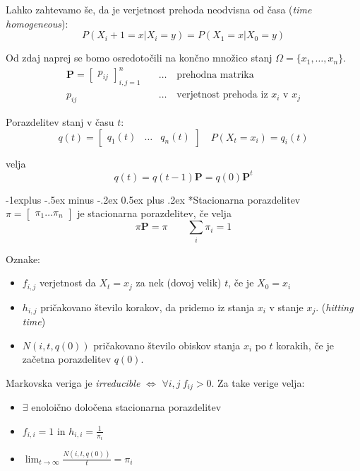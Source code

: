\documentclass[a3paper,8pt]{extarticle}
\makeatletter
\renewcommand{\subsection}{\@startsection{subsection}{2}{0mm}%
                                {-1explus -.5ex minus -.2ex}%
                                {0.5ex plus .2ex}%
                                {\normalfont\normalsize\bfseries}}
\makeatother
\begin{document}
\begin{multicols}{4}
Lahko zahtevamo še, da je verjetnost prehoda neodvisna od časa (\textit{time homogeneous}):
\[ P(X_i+1 = x | X_i = y) = P(X_1 = x | X_0 = y)\]

Od zdaj naprej se bomo osredotočili na končno množico stanj $\Omega = \{x_1, \dots, x_n\}$. 
\begin{align*}
    \mathbf{P} = \begin{bmatrix}
        p_{ij}
    \end{bmatrix}_{i,j = 1}^n\quad &\dots \quad \text{prehodna matrika} \\
    p_{ij} \quad &\dots \quad \text{verjetnost prehoda iz $x_i$ v $x_j$}
\end{align*}

Porazdelitev stanj v času $t$:
\[q(t) = \begin{bmatrix}
    q_1(t) & \dots & q_n(t)
\end{bmatrix} \quad P(X_t = x_i) = q_i(t) \] 

velja
\[ q(t) = q(t-1) \mathbf{P} = q(0) \mathbf{P}^t \]

\subsection*{Stacionarna porazdelitev}
$\pi = \begin{bmatrix} \pi_1 \dots \pi_n \end{bmatrix}$ je stacionarna porazdelitev, če velja 
\[\pi \mathbf{P} = \pi \qquad \sum_{i} \pi_i = 1 \]

Oznake:
\begin{itemize}
    \item $f_{i,j}$ verjetnost da $X_t = x_j$ za nek (dovoj velik) $t$, če je $X_0 = x_i$
    \item $h_{i,j}$ pričakovano število korakov, da pridemo iz stanja $x_i$ v stanje $x_j$. (\textit{hitting time})
    \item $N(i, t, q(0))$ pričakovano število obiskov stanja $x_i$ po $t$ korakih, če je začetna porazdelitev $q(0)$.
\end{itemize}

Markovska veriga je \textit{irreducible} $\iff$ $\forall i, j \ f_{ij} > 0$. Za take verige velja:
\begin{itemize}
    \item $\exists$ enoloično določena stacionarna porazdelitev
    \item $f_{i,i} = 1$ in $h_{i,i} = \frac{1}{\pi_i}$
    \item $\lim_{t \to \infty} \frac{N(i, t, q(0))}{t} = \pi_i$
\end{itemize}


\end{multicols}
\end{document}
